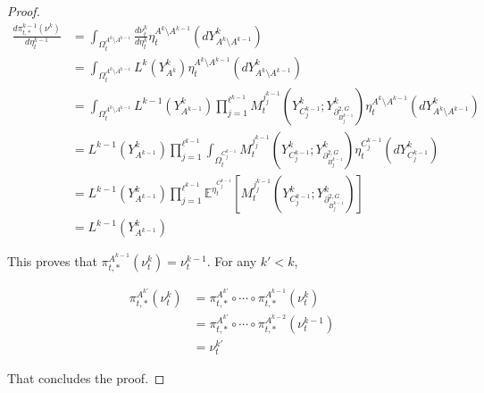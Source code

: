 \documentclass[12pt]{article}
\newcommand{\mb}{\mathbb}
\newcommand{\exmu}[2]{\mb{E}^{#1}\left[#2\right]}	%
\newcommand{\dgneigh}[2]{\partial^{2,#1}_{#2}}		%
\newcommand{\indx}[1]{^{#1}}						%
\newcommand{\proj}{\pi}								%
\newcommand{\vind}[1]{_{#1}}						%
\newcommand{\vpara}[1]{^{#1}}						%
\newcommand{\tpara}[1]{_{#1}}						%
\newcommand{\tparapsf}[1]{_{#1,*}}					%
\newcommand{\psize}{\ell}							%
\newcommand{\Xg}{Y}									%
\newcommand{\mm}{\nu}								%
\newcommand{\mmm}{\eta}								%
\newcommand{\dense}{L}								%
\newcommand{\mdense}{M}								%
\newcommand{\jpara}[1]{^{#1}}						%
\begin{document}
\begin{proof}
\begin{align*}
\frac{d\proj\tparapsf{t}\indx{k-1}(\mm\indx{k})}{d\mmm\indx{k-1}\tpara{t}} &= \int_{\Omega\vpara{A\indx{k}\setminus A\indx{k-1}}\tpara{t}} \frac{d\mm\indx{k}\tpara{t}}{d\mmm\indx{k}\tpara{t}}\mmm\vpara{A\indx{k}\setminus A\indx{k-1}}\tpara{t}(d\Xg\indx{k}\vind{A\indx{k}\setminus A\indx{k-1}})\\
&=\int_{\Omega\vpara{A\indx{k}\setminus A\indx{k-1}}\tpara{t}} \dense\indx{k}(\Xg\indx{k}\vind{A\indx{k}})\mmm\vpara{A\indx{k}\setminus A\indx{k-1}}\tpara{t}(d\Xg\indx{k}\vind{A\indx{k}\setminus A\indx{k-1}})\\
&=\int_{\Omega\vpara{A\indx{k}\setminus A\indx{k-1}}\tpara{t}} \dense\indx{k-1}(\Xg\indx{k}\vind{A\indx{k-1}})\prod_{j=1}^{\psize\indx{k-1}}\mdense\jpara{j_j\indx{k-1}}\tpara{t}\left(\Xg\indx{k}\vind{C_j\indx{k-1}};\Xg\indx{k}\vind{\dgneigh{G}{B_j\indx{k-1}}}\right)\mmm\vpara{A\indx{k}\setminus A\indx{k-1}}\tpara{t}(d\Xg\indx{k}\vind{A\indx{k}\setminus A\indx{k-1}})\\
&=\dense\indx{k-1}(\Xg\indx{k}\vind{A\indx{k-1}})\prod_{j=1}^{\psize\indx{k-1}} \int_{\Omega\vpara{C_j\indx{k-1}}\tpara{t}}\mdense\jpara{j_j\indx{k-1}}\tpara{t}\left(\Xg\indx{k}\vind{C_j\indx{k-1}};\Xg\indx{k}\vind{\dgneigh{G}{B_j\indx{k-1}}}\right)\mmm\vpara{C_j\indx{k-1}}\tpara{t}(d\Xg\indx{k}\vind{C_j\indx{k-1}})\\
&=\dense\indx{k-1}(\Xg\indx{k}\vind{A\indx{k-1}})\prod_{j=1}^{\psize\indx{k-1}} \exmu{\mmm\vpara{C_j\indx{k-1}}\tpara{t}}{\mdense\jpara{j_j\indx{k-1}}\tpara{t}\left(\Xg\indx{k}\vind{C_j\indx{k-1}};\Xg\indx{k}\vind{\dgneigh{G}{B_j\indx{k-1}}}\right)}\\
&=\dense\indx{k-1}(\Xg\indx{k}\vind{A\indx{k-1}})
\end{align*}

This proves that \(\proj\tparapsf{t}\vpara{A\indx{k-1}}(\mm\indx{k}\tpara{t}) = \mm\indx{k-1}\tpara{t}\). For any \(k' < k\),

\begin{align*}
\proj\tparapsf{t}\vpara{A\indx{k'}}(\mm\indx{k}\tpara{t}) &= \proj\tparapsf{t}\vpara{A\indx{k'}}\circ\cdots\circ\proj\tparapsf{t}\vpara{A\indx{k-1}}(\mm\indx{k}\tpara{t})\\
&=\proj\tparapsf{t}\vpara{A\indx{k'}}\circ\cdots\circ\proj\tparapsf{t}\vpara{A\indx{k-2}}(\mm\indx{k-1}\tpara{t})\\
&= \mm\indx{k'}\tpara{t}
\end{align*}

That concludes the proof.
\end{proof}
\end{document}
